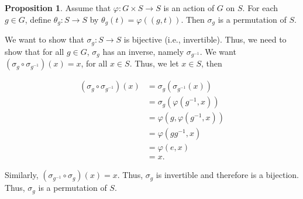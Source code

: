 \documentclass{article}
\makeatletter
\theoremstyle{definition}
\newtheorem{prop}{Proposition}[section]
\theoremstyle{remark}
\let\oldproofname=\proofname
\renewcommand{\proofname}{\bf{\textit{\oldproofname}}}
\theoremstyle{definition}
\renewenvironment{proof}[1][\proofname]{\par
  \pushQED{\qed}%
  \normalfont \topsep6\p@\@plus6\p@\relax
  \list{}{\leftmargin=0mm
          \rightmargin=0mm
          \settowidth{\itemindent}{\itshape#1}%
          \labelwidth=4mm
          \parsep=0pt \listparindent=0mm%
  }
  \item[\hskip\labelsep
        \itshape
    #1\@addpunct{.}]\ignorespaces
}{%
  \popQED\endlist\@endpefalse
}
\makeatother
\begin{document}
    \begin{prop}\label{prop:1.8}
        Assume that $\varphi\colon G\times S\rightarrow S$ is an action of $G$ on $S$. For each $g\in G$, define $\theta_g\colon S\rightarrow S$ by $\theta_g(t)=\varphi((g,t))$. Then $\sigma_g$ is a permutation of $S$.
    \end{prop}
        \begin{proof}
            We want to show that $\sigma_g\colon S\rightarrow S$ is bijective (i.e., invertible). Thus, we need to show that for all $g\in G$, $\sigma_g$ has an inverse, namely $\sigma_{g^{-1}}$. We want $(\sigma_g\circ\sigma_{g^{-1}})(x)=x$, for all $x\in S$. Thus, we let $x\in S$, then 
            
            \begin{equation*}
                \begin{split}
                    (\sigma_g\circ\sigma_{g^{-1}})(x) &= \sigma_g(\sigma_{g^{-1}}(x)) \\
                    &= \sigma_g(\varphi(g^{-1},x)) \\
                    &= \varphi(g,\varphi(g^{-1},x)) \\
                    &= \varphi(gg^{-1},x) \\
                    &= \varphi(e,x) \\
                    &= x.
                \end{split}
            \end{equation*}
            
            Similarly, $(\sigma_{g^{-1}}\circ\sigma_g)(x)=x$. Thus, $\sigma_g$ is invertible and therefore is a bijection. Thus, $\sigma_g$ is a permutation of $S$.
        \end{proof}
        
\end{document}
